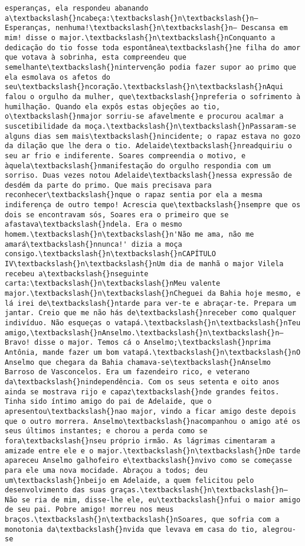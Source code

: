 \begin{Verbatim}[commandchars=\\\{\}]
esperanças, ela respondeu abanando a\textbackslash{}ncabeça:\textbackslash{}n\textbackslash{}n— Esperanças, nenhuma!\textbackslash{}n\textbackslash{}n— Descansa em mim! disse o major.\textbackslash{}n\textbackslash{}nConquanto a dedicação do tio fosse toda espontânea\textbackslash{}ne filha do amor que votava à sobrinha, esta compreendeu que semelhante\textbackslash{}nintervenção podia fazer supor ao primo que ela esmolava os afetos do seu\textbackslash{}ncoração.\textbackslash{}n\textbackslash{}nAqui falou o orgulho da mulher, que\textbackslash{}npreferia o sofrimento à humilhação. Quando ela expôs estas objeções ao tio, o\textbackslash{}nmajor sorriu-se afavelmente e procurou acalmar a suscetibilidade da moça.\textbackslash{}n\textbackslash{}nPassaram-se alguns dias sem mais\textbackslash{}nincidente; o rapaz estava no gozo da dilação que lhe dera o tio. Adelaide\textbackslash{}nreadquiriu o seu ar frio e indiferente. Soares compreendia o motivo, e àquela\textbackslash{}nmanifestação do orgulho respondia com um sorriso. Duas vezes notou Adelaide\textbackslash{}nessa expressão de desdém da parte do primo. Que mais precisava para reconhecer\textbackslash{}nque o rapaz sentia por ela a mesma indiferença de outro tempo! Acrescia que\textbackslash{}nsempre que os dois se encontravam sós, Soares era o primeiro que se afastava\textbackslash{}ndela. Era o mesmo homem.\textbackslash{}n\textbackslash{}n'Não me ama, não me amará\textbackslash{}nnunca!' dizia a moça consigo.\textbackslash{}n\textbackslash{}nCAPÍTULO IV\textbackslash{}n\textbackslash{}nUm dia de manhã o major Vilela recebeu a\textbackslash{}nseguinte carta:\textbackslash{}n\textbackslash{}nMeu valente major.\textbackslash{}n\textbackslash{}nCheguei da Bahia hoje mesmo, e lá irei de\textbackslash{}ntarde para ver-te e abraçar-te. Prepara um jantar. Creio que me não hás de\textbackslash{}nreceber como qualquer indivíduo. Não esqueças o vatapá.\textbackslash{}n\textbackslash{}nTeu amigo,\textbackslash{}nAnselmo.\textbackslash{}n\textbackslash{}n— Bravo! disse o major. Temos cá o Anselmo;\textbackslash{}nprima Antônia, mande fazer um bom vatapá.\textbackslash{}n\textbackslash{}nO Anselmo que chegara da Bahia chamava-se\textbackslash{}nAnselmo Barroso de Vasconcelos. Era um fazendeiro rico, e veterano da\textbackslash{}nindependência. Com os seus setenta e oito anos ainda se mostrava rijo e capaz\textbackslash{}nde grandes feitos. Tinha sido íntimo amigo do pai de Adelaide, que o apresentou\textbackslash{}nao major, vindo a ficar amigo deste depois que o outro morrera. Anselmo\textbackslash{}nacompanhou o amigo até os seus últimos instantes; e chorou a perda como se fora\textbackslash{}nseu próprio irmão. As lágrimas cimentaram a amizade entre ele e o major.\textbackslash{}n\textbackslash{}nDe tarde apareceu Anselmo galhofeiro e\textbackslash{}nvivo como se começasse para ele uma nova mocidade. Abraçou a todos; deu um\textbackslash{}nbeijo em Adelaide, a quem felicitou pelo desenvolvimento das suas graças.\textbackslash{}n\textbackslash{}n— Não se ria de mim, disse-lhe ele, eu\textbackslash{}nfui o maior amigo de seu pai. Pobre amigo! morreu nos meus braços.\textbackslash{}n\textbackslash{}nSoares, que sofria com a monotonia da\textbackslash{}nvida que levava em casa do tio, alegrou-se 
\end{Verbatim}

